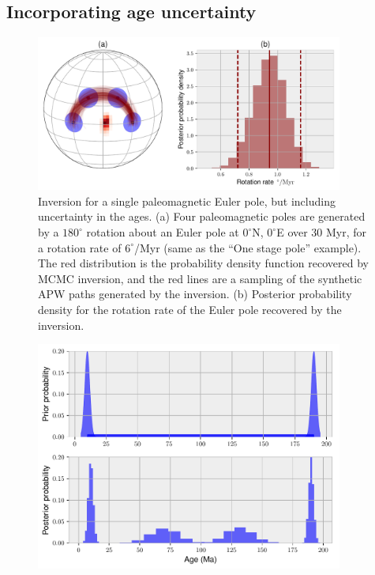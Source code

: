 \documentclass[preprint,12pt,authoryear]{elsarticle}
\begin{document}
\subsection{Incorporating age uncertainty}
\begin{figure}
\includegraphics[width=0.9\textwidth]{figures/synthetic/age_uncertainty.pdf}
\caption[Inversion for a paleomagnetic Euler pole, incorporating age uncertainty.]{Inversion for a single paleomagnetic Euler pole, but including uncertainty in the ages. (a) Four paleomagnetic poles are generated by a $180^\circ$ rotation about an Euler pole at $0^\circ$N, $0^\circ$E over 30 Myr, for a rotation rate of $6^\circ$/Myr (same as the ``One stage pole'' example). The red distribution is the probability density function recovered by MCMC inversion, and the red lines are a sampling of the synthetic APW paths generated by the inversion. (b) Posterior probability density for the rotation rate of the Euler pole recovered by the inversion.}
\label{fig:age_uncertainty}
\end{figure}
\begin{figure}
\includegraphics[width=0.9\textwidth]{figures/synthetic/age_uncertainty_samples.pdf}
\caption{}
\label{fig:age_uncertainty_samples}
\end{figure}
\end{document}
